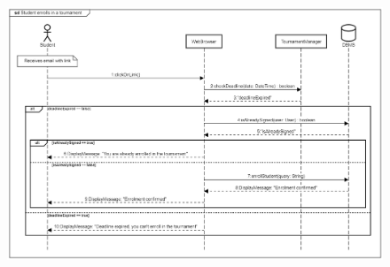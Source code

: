 \documentclass[12pt,oneside,a4paper]{article}
\begin{document}
\begin{figure}[htbp]
    \centering
    \includegraphics[width=1\linewidth]{Images//Sequence Diagrams/studentEnrollsTournament.png}
    \label{fig:enter-label}
\end{figure}
\clearpage
\end{document}
